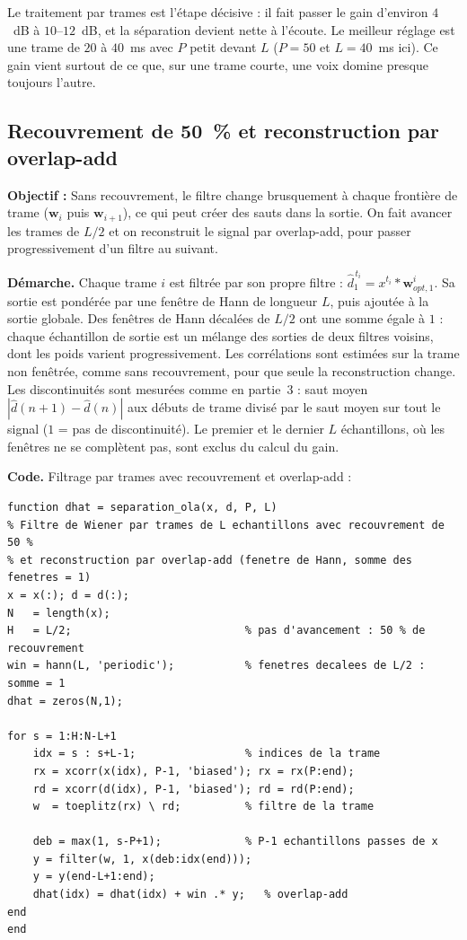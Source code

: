\begin{resultat}[Conclusion]
Le traitement par trames est l'étape décisive : il fait passer le gain d'environ $4$~dB à $10$--$12$~dB, et la séparation devient nette à l'écoute. Le meilleur réglage est une trame de $20$ à $40$~ms avec $P$ petit devant $L$ ($P=50$ et $L=40$~ms ici). Ce gain vient surtout de ce que, sur une trame courte, une voix domine presque toujours l'autre.
\end{resultat}

\subsection{Recouvrement de 50~\% et reconstruction par overlap-add}

\begin{enonce}
\textbf{Objectif :} Sans recouvrement, le filtre change brusquement à chaque frontière de trame ($\mathbf{w}_i$ puis $\mathbf{w}_{i+1}$), ce qui peut créer des sauts dans la sortie. On fait avancer les trames de $L/2$ et on reconstruit le signal par overlap-add, pour passer progressivement d'un filtre au suivant.
\end{enonce}

\textbf{Démarche.} Chaque trame $i$ est filtrée par son propre filtre : $\hat d_1^{\,t_i}=x^{t_i}*\mathbf{w}^i_{opt,1}$. Sa sortie est pondérée par une fenêtre de Hann de longueur $L$, puis ajoutée à la sortie globale. Des fenêtres de Hann décalées de $L/2$ ont une somme égale à $1$ : chaque échantillon de sortie est un mélange des sorties de deux filtres voisins, dont les poids varient progressivement. Les corrélations sont estimées sur la trame non fenêtrée, comme sans recouvrement, pour que seule la reconstruction change. Les discontinuités sont mesurées comme en partie~3 : saut moyen $|\hat d(n+1)-\hat d(n)|$ aux débuts de trame divisé par le saut moyen sur tout le signal ($1$ = pas de discontinuité). Le premier et le dernier $L$ échantillons, où les fenêtres ne se complètent pas, sont exclus du calcul du gain.

\textbf{Code.} Filtrage par trames avec recouvrement et overlap-add :
\begin{lstlisting}
function dhat = separation_ola(x, d, P, L)
% Filtre de Wiener par trames de L echantillons avec recouvrement de 50 %
% et reconstruction par overlap-add (fenetre de Hann, somme des fenetres = 1)
x = x(:); d = d(:);
N   = length(x);
H   = L/2;                           % pas d'avancement : 50 % de recouvrement
win = hann(L, 'periodic');           % fenetres decalees de L/2 : somme = 1
dhat = zeros(N,1);

for s = 1:H:N-L+1
    idx = s : s+L-1;                 % indices de la trame
    rx = xcorr(x(idx), P-1, 'biased'); rx = rx(P:end);
    rd = xcorr(d(idx), P-1, 'biased'); rd = rd(P:end);
    w  = toeplitz(rx) \ rd;          % filtre de la trame

    deb = max(1, s-P+1);             % P-1 echantillons passes de x
    y = filter(w, 1, x(deb:idx(end)));
    y = y(end-L+1:end);
    dhat(idx) = dhat(idx) + win .* y;   % overlap-add
end
end
\end{lstlisting}

